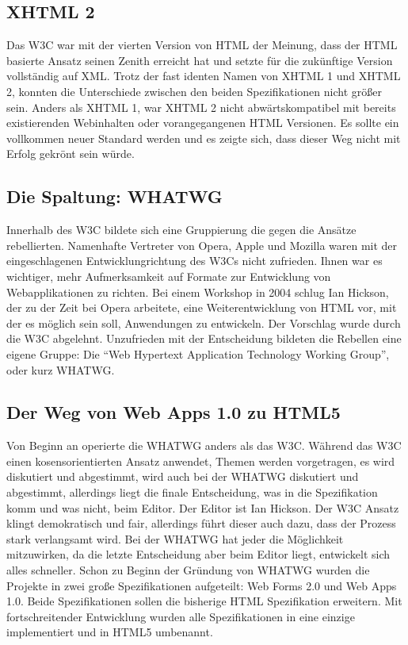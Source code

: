 \subsection{XHTML 2}
Das W3C war mit der vierten Version von HTML der Meinung, dass der HTML
basierte Ansatz seinen Zenith erreicht hat und setzte für die zukünftige
Version vollständig auf XML. Trotz der fast identen Namen von XHTML 1 und
XHTML 2, konnten die Unterschiede zwischen den beiden Spezifikationen nicht
größer sein. Anders als XHTML 1, war XHTML 2 nicht abwärtskompatibel mit
bereits existierenden Webinhalten oder vorangegangenen HTML Versionen. Es
sollte ein vollkommen neuer Standard werden und es zeigte sich, dass dieser
Weg nicht mit Erfolg gekrönt sein würde.

\subsection{Die Spaltung: WHATWG}
Innerhalb des W3C bildete sich eine Gruppierung die gegen die Ansätze
rebellierten. Namenhafte Vertreter von Opera, Apple und Mozilla waren mit der
eingeschlagenen Entwicklungrichtung des W3Cs nicht zufrieden. Ihnen war es
wichtiger, mehr Aufmerksamkeit auf Formate zur Entwicklung von Webapplikationen
zu richten. Bei einem Workshop in 2004 schlug Ian Hickson, der zu der Zeit bei
Opera arbeitete, eine Weiterentwicklung von HTML vor, mit der es möglich sein
soll, Anwendungen zu entwickeln. Der Vorschlag wurde durch die W3C abgelehnt.
Unzufrieden mit der Entscheidung bildeten die Rebellen eine eigene Gruppe:
Die ``Web Hypertext Application Technology Working Group'', oder kurz WHATWG.

\subsection{Der Weg von Web Apps 1.0 zu HTML5}
Von Beginn an operierte die WHATWG anders als das W3C. Während das W3C einen
kosensorientierten Ansatz anwendet, Themen werden vorgetragen, es wird
diskutiert und abgestimmt, wird auch bei der WHATWG diskutiert und abgestimmt,
allerdings liegt die finale Entscheidung, was in die Spezifikation komm und
was nicht, beim Editor. Der Editor ist Ian Hickson. Der W3C Ansatz klingt
demokratisch und fair, allerdings führt dieser auch dazu, dass der Prozess
stark verlangsamt wird. Bei der WHATWG hat jeder die Möglichkeit mitzuwirken,
da die letzte Entscheidung aber beim Editor liegt, entwickelt sich alles
schneller. Schon zu Beginn der Gründung von WHATWG wurden die Projekte in zwei
große Spezifikationen aufgeteilt: Web Forms 2.0 und Web Apps 1.0. Beide
Spezifikationen sollen die bisherige HTML Spezifikation erweitern. Mit
fortschreitender Entwicklung wurden alle Spezifikationen in eine einzige
implementiert und in HTML5 umbenannt.

